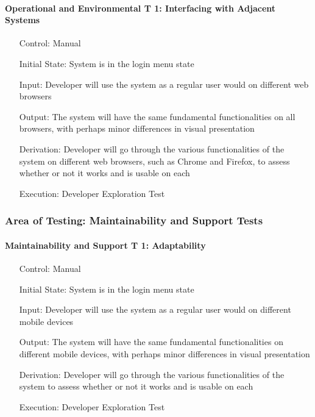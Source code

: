 \documentclass[12pt, titlepage]{article}
\begin{document}
\paragraph*{Operational and Environmental T 1: Interfacing with Adjacent Systems}
\begin{itemize}
	\item[Control:] Manual
	\item[Initial State:] System is in the login menu state
	\item[Input:] Developer will use the system as a regular user would on different web browsers
	\item[Output:] The system will have the same fundamental functionalities on all browsers, with perhaps minor differences in visual presentation
	\item[Derivation:] Developer will go through the various functionalities of the system on different web browsers, such as Chrome and Firefox, to assess whether or not it works and is usable on each
	\item[Execution:] Developer Exploration Test
\end{itemize}

\subsubsection{Area of Testing: Maintainability and Support Tests}

\paragraph*{Maintainability and Support T 1: Adaptability}
\begin{itemize}
	\item[Control:] Manual
	\item[Initial State:] System is in the login menu state
	\item[Input:] Developer will use the system as a regular user would on different mobile devices
	\item[Output:] The system will have the same fundamental functionalities on different mobile devices, with perhaps minor differences in visual presentation
	\item[Derivation:] Developer will go through the various functionalities of the system to assess whether or not it works and is usable on each
	\item[Execution:] Developer Exploration Test
\end{itemize}
\end{document}
